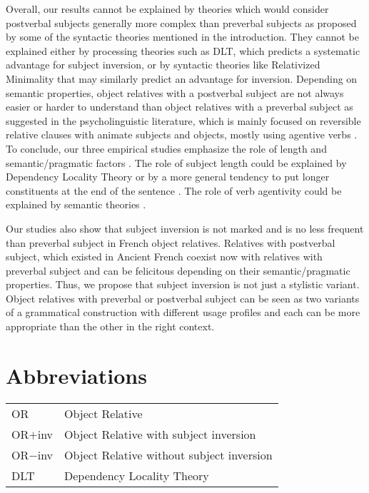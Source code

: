 \documentclass[output=paper]{langscibook}
\begin{document}
Overall, our results cannot be explained by theories which would consider postverbal subjects generally more complex than preverbal subjects as proposed by some of the syntactic theories mentioned in the introduction. They cannot be explained either by processing theories such as DLT, which predicts a systematic advantage for subject inversion, or by syntactic theories like Relativized Minimality that may similarly predict an advantage for inversion.  Depending on semantic properties, object relatives with a postverbal subject are not always easier or harder to understand than object relatives with a preverbal subject as suggested in the psycholinguistic literature, which is mainly focused on reversible relative clauses with animate subjects and objects, mostly using agentive verbs \citep{Holmes1981, baudiffier2011effect, pozniak2015processing}. \\

To conclude, our three empirical studies emphasize the role of length and semantic/pragmatic factors \citep{mak2006animacy, traxler2002}. The role of subject length could be explained by Dependency Locality Theory \citep{gibson2000} or by a more general tendency to put longer constituents at the end of the sentence \citep{Behaghel, wasow2002postverbal}.  The role of verb agentivity could be explained by semantic theories \citep{Fuchs2006, marandin2011}. 

Our studies also show that subject inversion is not marked and is no less frequent than preverbal subject in French object relatives. Relatives with postverbal subject, which existed in Ancient French \citep{buridant1999ordre, fuchs2006franccais} coexist now with relatives with preverbal subject and can be felicitous depending on their semantic/pragmatic properties. Thus, we propose that subject inversion is not just a stylistic variant. Object relatives with preverbal or postverbal subject can be seen as two variants of a grammatical construction with different usage profiles and each can be more appropriate than the other in the right context.




\section*{Abbreviations}
\begin{tabularx}{.7\textwidth}{ll}
OR & Object Relative\\
OR$+$inv & Object Relative with subject inversion \\
OR$-$inv & Object Relative without subject inversion\\
DLT & Dependency Locality Theory \\
\end{tabularx}
\end{document}
